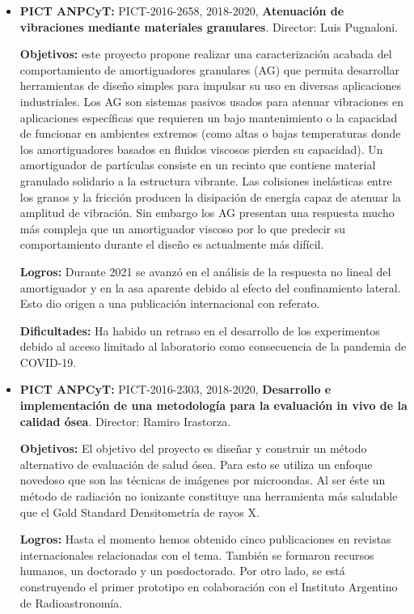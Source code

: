 \documentclass[a4paper,11pt,twoside,final,titlepage,onecolumn,openright]{report}
\begin{document}
\begin{itemize}
 \item {\bf PICT ANPCyT:} PICT-2016-2658, 2018-2020, {\bf Atenuación de vibraciones mediante materiales granulares}. Director: Luis Pugnaloni.
 
  {\bf Objetivos:} este proyecto propone realizar una caracterización acabada del comportamiento de amortiguadores granulares (AG) que permita desarrollar herramientas de diseño simples para impulsar su uso en diversas aplicaciones industriales. Los AG son sistemas pasivos usados para atenuar vibraciones en aplicaciones específicas que requieren un bajo mantenimiento o la capacidad de funcionar en ambientes extremos (como altas o bajas temperaturas donde los amortiguadores basados en fluidos viscosos pierden su capacidad). Un amortiguador de partículas consiste en un recinto que contiene material granulado solidario a la estructura vibrante. Las colisiones inelásticas entre los granos y la fricción producen la disipación de energía capaz de atenuar la amplitud de vibración. Sin embargo los AG presentan una respuesta mucho más compleja que un amortiguador viscoso por lo que predecir su comportamiento durante el diseño es actualmente más difícil.

 {\bf Logros:} Durante 2021 se avanzó en el análisis de la respuesta no lineal del amortiguador y en la asa aparente debido al efecto del confinamiento lateral. Esto dio origen a una publicación internacional con referato.
 
 {\bf Dificultades:} Ha habido un retraso en el desarrollo de los experimentos debido al acceso limitado al laboratorio como consecuencia de la pandemia de COVID-19.

\item {\bf PICT ANPCyT:} PICT-2016-2303, 2018-2020, {\bf Desarrollo e implementación de una metodología para la evaluación in vivo de la calidad ósea}. Director: Ramiro Irastorza.
 
{\bf Objetivos:} El objetivo del proyecto es diseñar y construir un método alternativo de evaluación de salud ósea. Para esto se utiliza un enfoque novedoso que son las técnicas de imágenes por microondas.
Al ser éste un método de radiación no ionizante constituye una herramienta más saludable que el Gold Standard Densitometría de rayos X.

 
 {\bf Logros:} Hasta el momento hemos obtenido cinco publicaciones en revistas internacionales relacionadas con el tema. También se formaron recursos humanos, un doctorado y un posdoctorado. Por otro lado, se está construyendo el primer prototipo en colaboración con el Instituto Argentino de Radioastronomía.
 

\end{itemize}
\end{document}
